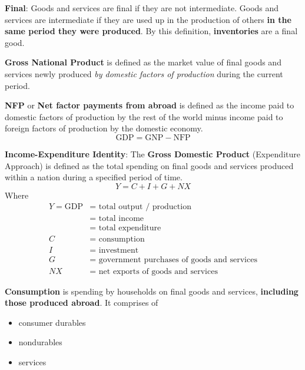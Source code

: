 \begin{remarks}
    \textbf{Final}: Goods and services are final if they are not intermediate. Goods and services are intermediate if they are used up in the production of others \textbf{in the same period they were produced}. By this definition, \textbf{inventories} are a final good. 
\end{remarks}

\begin{definition}
    \textbf{Gross National Product} is defined as the market value of final goods and services newly produced \textit{by domestic factors of production} during the current period.
\end{definition}

\begin{definition}
    \textbf{NFP} or \textbf{Net factor payments from abroad} is defined as the income paid to domestic factors of production by the rest of the world minus income paid to foreign factors of production by the domestic economy.
    \[
        \text{GDP} = \text{GNP} - \text{NFP}
    \]
\end{definition}

\begin{definition}
    \textbf{Income-Expenditure Identity}: The \textbf{Gross Domestic Product} (Expenditure Approach) is defined as the total spending on final goods and services produced within a nation during a specified period of time. 
    \[
        Y = C + I + G + NX
    \]
    Where 
    \begin{align*}
        Y = \text{GDP} &= \text{ total output / production} \\
        &= \text{ total income} \\
        &= \text{ total expenditure} \\
        C &= \text{ consumption} \\
        I &= \text{ investment} \\
        G &= \text{ government purchases of goods and services} \\
        NX &= \text{ net exports of goods and services}
    \end{align*}
\end{definition}

\begin{remarks}
    \textbf{Consumption} is spending by households on final goods and services, \textbf{including those produced abroad}. It comprises of
    \begin{itemize}
        \item consumer durables
        \item nondurables
        \item services
    \end{itemize} 
\end{remarks}

